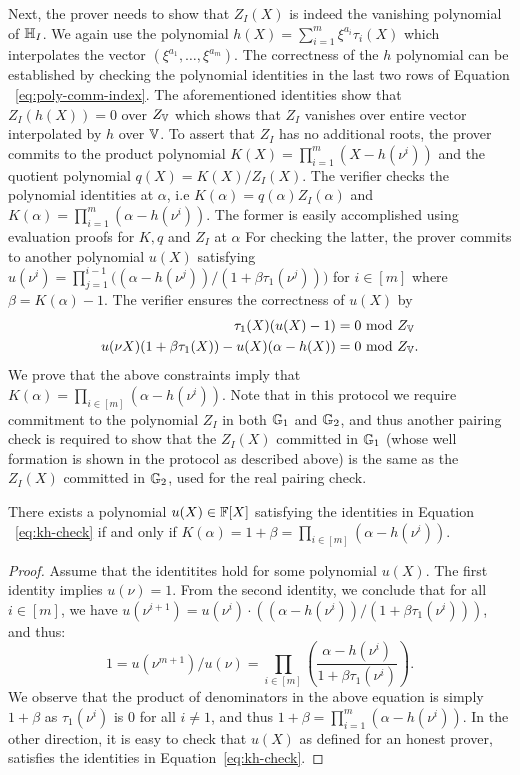 Next, the prover needs to show that $Z_I(X)$ is indeed the vanishing polynomial of $\mathbb{H}_I$.
We again use the polynomial $h(X)=\sum_{i=1}^m \xi^{a_i}\tau_i(X)$ which interpolates the vector $(\xi^{a_1},\ldots,\xi^{a_m})$.
The correctness of the $h$ polynomial can be established by checking the polynomial identities in the last two rows of Equation
~\eqref{eq:poly-comm-index}. The aforementioned identities show that $Z_I(h(X)) = 0$ over $Z_{\mathbb{V}}$ which shows that $Z_I$ vanishes over
entire vector interpolated by $h$ over $\mathbb{V}$. To assert that $Z_I$ has no additional roots, the prover commits to the product polynomial
$K(X)=\prod_{i=1}^m (X - h(\nu^i))$ and the quotient polynomial $q(X)=K(X)/Z_I(X)$. The verifier checks the polynomial identities
at $\alpha$, i.e $K(\alpha)=q(\alpha)Z_I(\alpha)$ and $K(\alpha)=\prod_{i=1}^m(\alpha - h(\nu^i))$.
The former is easily accomplished
using evaluation proofs for $K,q$ and $Z_I$ at $\alpha$
For checking the latter, the prover commits to another polynomial
$u(X)$ satisfying $u(\nu^i)=\prod_{j=1}^{i-1}\big((\alpha - h(\nu^j))/(1 + \beta\tau_1(\nu^j))\big)$ for $i\in [m]$
where $\beta=K(\alpha) - 1$.
The verifier ensures the correctness of $u(X)$ by
\begin{equation}
    \begin{aligned}
        \tau_1(X)(u(X) - 1) &= 0 \text{ mod } Z_{\mathbb{V}} \\
        u(\nu X)(1+\beta \tau_1(X))-u(X)(\alpha - h(X)) &= 0 \text{ mod } Z_{\mathbb{V}}.
    \end{aligned}
    \label{eq:kh-check}
\end{equation}
We prove that the above constraints imply that $K(\alpha)=\prod_{i\in [m]}(\alpha - h(\nu^i))$.
Note that in this protocol we require commitment to the polynomial $Z_I$ in both $\mathbb{G}_1$ and $\mathbb{G}_2$,
and thus another pairing check is required to show that the $Z_I(X)$ committed in $\mathbb{G}_1$
(whose well formation is shown in the protocol as described above) is the same as the $Z_I(X)$ committed in $\mathbb{G}_2$,
used for the real pairing check.
\begin{lemma}\label{lem:kh-check}
There exists a polynomial $u(X)\in \mathbb{F}[X]$ satisfying the identities in Equation ~\eqref{eq:kh-check}
if and only if $K(\alpha)=1+\beta=\prod_{i\in [m]} (\alpha - h(\nu^i))$.
\end{lemma}
\begin{proof}
    Assume that the identitites hold for some polynomial $u(X)$.
    The first identity implies $u(\nu)=1$. From the second identity, we conclude that for all $i\in [m]$, we have
    $u(\nu^{i+1})=u(\nu^i)\cdot ((\alpha - h(\nu^i))/(1+\beta \tau_1(\nu^i)))$, and thus:
    $$1 = u(\nu^{m+1})/u(\nu) = \prod_{i\in [m]}\left(\frac{\alpha - h(\nu^i)}{1+\beta \tau_1(\nu^i)}\right).$$
    We observe that the product of denominators in the above equation is simply $1+\beta$ as $\tau_1(\nu^i)$
    is $0$ for all $i\neq 1$, and thus $1+\beta = \prod_{i=1}^m (\alpha - h(\nu^i))$. In the other direction,
    it is easy to check that $u(X)$ as defined for an honest prover, satisfies the identities in Equation~\ref{eq:kh-check}.
\end{proof}

